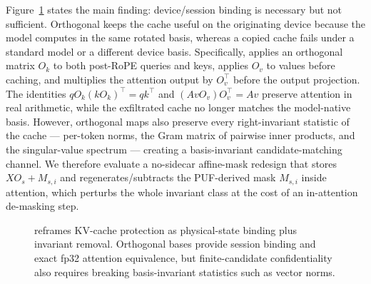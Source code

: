 Figure~\ref{fig:overview} states the main finding: device/session binding is necessary but not sufficient. Orthogonal \sys{} keeps the cache useful on the originating device because the model computes in the same rotated basis, whereas a copied cache fails under a standard model or a different device basis. Specifically, \sys{} applies an orthogonal matrix $O_k$ to both post-RoPE queries and keys, applies $O_v$ to values before caching, and multiplies the attention output by $O_v^\top$ before the output projection. The identities $qO_k(kO_k)^\top = qk^\top$ and $(AvO_v)O_v^\top=Av$ preserve attention in real arithmetic, while the exfiltrated cache no longer matches the model-native basis. However, orthogonal maps also preserve every right-invariant statistic of the cache --- per-token norms, the Gram matrix of pairwise inner products, and the singular-value spectrum --- creating a basis-invariant candidate-matching channel. We therefore evaluate a no-sidecar affine-mask redesign that stores $XO_s+M_{s,i}$ and regenerates/subtracts the PUF-derived mask $M_{s,i}$ inside attention, which perturbs the whole invariant class at the cost of an in-attention de-masking step.

\begin{figure}[t]
\centering
{}
\caption{\sys{} reframes KV-cache protection as physical-state binding plus invariant removal. Orthogonal bases provide session binding and exact fp32 attention equivalence, but finite-candidate confidentiality also requires breaking basis-invariant statistics such as vector norms.}
\label{fig:overview}
\end{figure}

